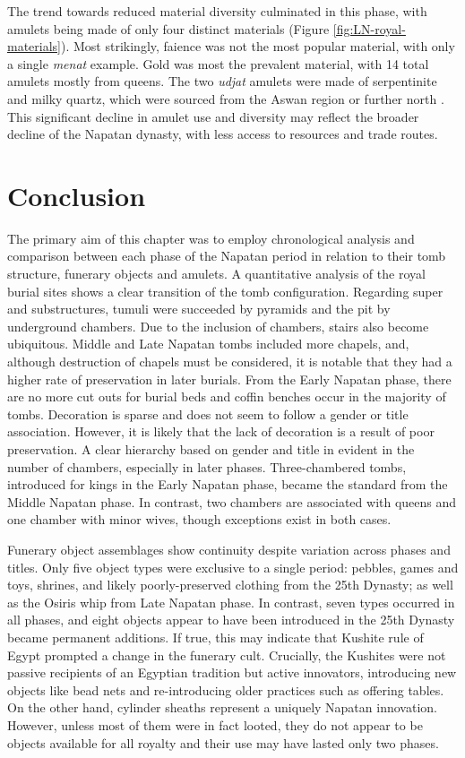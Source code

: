 The trend towards reduced material diversity culminated in this phase, with amulets being made of only four distinct materials (Figure \ref{fig:LN-royal-materials}). Most strikingly, faience was not the most popular material, with only a single \textit{menat} example. Gold was most the prevalent material, with 14 total amulets mostly from queens. The two \textit{udjat} amulets were made of serpentinite and milky quartz, which were sourced from the Aswan region or further north \parencites[p.~506-507, 759]{harrellArchaeologyGeologyAncient2024}. This significant decline in amulet use and diversity may reflect the broader decline of the Napatan dynasty, with less access to resources and trade routes.


\section{Conclusion}


The primary aim of this chapter was to employ chronological analysis and comparison between each phase of the Napatan period in relation to their tomb structure, funerary objects and amulets. A quantitative analysis of the royal burial sites shows a clear transition of the tomb configuration. Regarding super and substructures, tumuli were succeeded by pyramids and the pit by underground chambers. Due to the inclusion of chambers, stairs also become ubiquitous. Middle and Late Napatan tombs included more chapels, and, although destruction of chapels must be considered, it is notable that they had a higher rate of preservation in later burials. From the Early Napatan phase, there are no more cut outs for burial beds and coffin benches occur in the majority of tombs. Decoration is sparse and does not seem to follow a gender or title association. However, it is likely that the lack of decoration is a result of poor preservation. A clear hierarchy based on gender and title in evident in the number of chambers, especially in later phases.  Three-chambered tombs, introduced for kings in the Early Napatan phase, became the standard from the Middle Napatan phase. In contrast, two chambers are associated with queens and one chamber with minor wives, though exceptions exist in both cases.


Funerary object assemblages show continuity despite variation across phases and titles. Only five object types were exclusive to a single period: pebbles, games and toys, shrines, and likely poorly-preserved clothing from the 25th Dynasty; as well as the Osiris whip from Late Napatan phase. In contrast, seven types occurred in all phases, and eight objects appear to have been introduced in the 25th Dynasty became permanent additions. If true, this may indicate that Kushite rule of Egypt prompted a change in the funerary cult. Crucially, the Kushites were not passive recipients of an Egyptian tradition but active innovators, introducing new objects like bead nets and re-introducing older practices such as offering tables. On the other hand, cylinder sheaths represent a uniquely Napatan innovation. However, unless most of them were in fact looted, they do not appear to be objects available for all royalty and their use may have lasted only two phases.
 
